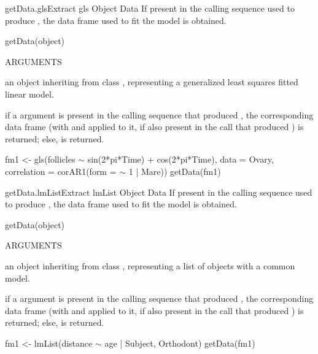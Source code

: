 \documentclass[pdftex]{article} \usepackage{url,graphicx}
\renewcommand{\Twiddle}{\mbox{\(\sim\)}}
\begin{document}
\begin{Helpfile}{getData.gls}{Extract gls Object Data}
If present in the calling sequence used to produce , the
data frame used to fit the model is obtained.
\begin{Example}
getData(object)
\end{Example}
\begin{Argument}{ARGUMENTS}
\item[\Co{object:}]
an object inheriting from class , representing
a generalized least squares fitted linear model.
\end{Argument}
if a  argument is present in the calling sequence that
produced , the corresponding data frame (with
 and  applied to it, if also present in
the call that produced ) is returned;
else,  is returned.
\need 15pt
\vspace{-16pt} 
\begin{Example}
fm1 <- gls(follicles {\Twiddle} sin(2*pi*Time) + cos(2*pi*Time), data = Ovary,
           correlation = corAR1(form = {\Twiddle} 1 | Mare))
getData(fm1)
\end{Example}
\end{Helpfile}
\begin{Helpfile}{getData.lmList}{Extract lmList Object Data}
If present in the calling sequence used to produce , the
data frame used to fit the model is obtained.
\begin{Example}
getData(object)
\end{Example}
\begin{Argument}{ARGUMENTS}
\item[\Co{object:}]
an object inheriting from class , representing
a list of  objects with a common model.
\end{Argument}
if a  argument is present in the calling sequence that
produced , the corresponding data frame (with
 and  applied to it, if also present in
the call that produced ) is returned;
else,  is returned.
\need 15pt
\vspace{-16pt} 
\begin{Example}
fm1 <- lmList(distance {\Twiddle} age | Subject, Orthodont)
getData(fm1)
\end{Example}
\end{Helpfile}
\end{document}
